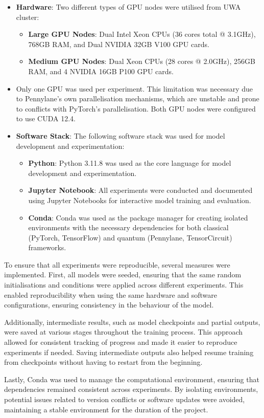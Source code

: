 \begin{itemize}
  \item \textbf{Hardware}: Two different types of GPU nodes were
        utilised from \gls{UWA} cluster:
        \begin{itemize}
          \item \textbf{Large GPU Nodes}: Dual Intel Xeon CPUs (36 cores
                total @ 3.1GHz), 768GB RAM, and Dual NVIDIA 32GB V100 GPU cards.
          \item \textbf{Medium GPU Nodes}: Dual Xeon CPUs (28 cores @
                2.0GHz), 256GB RAM, and 4 NVIDIA 16GB P100 GPU cards.
        \end{itemize}
  \item Only one GPU was used per experiment. This limitation was
        necessary due to Pennylane's own parallelisation mechanisms,
        which are unstable and prone to conflicts with PyTorch’s parallelisation.
        Both GPU nodes were configured to use CUDA 12.4.

  \item \textbf{Software Stack}: The following software stack was used
        for model development and experimentation:
        \begin{itemize}
          \item \textbf{Python}: Python 3.11.8 was used as the core
                language for model development and experimentation.
          \item \textbf{Jupyter Notebook}: All experiments were conducted
                and documented using Jupyter Notebooks for interactive model
                training and evaluation.
          \item \textbf{Conda}: Conda was used as the package manager for
                creating isolated environments with the necessary
                dependencies for both classical (PyTorch, TensorFlow) and
                quantum (Pennylane, TensorCircuit) frameworks.
        \end{itemize}
\end{itemize}

To ensure that all experiments were reproducible, several measures
were implemented. First, all models were seeded, ensuring that the
same random initialisations and conditions were applied across
different experiments. This enabled reproducibility when using the
same hardware and software configurations, ensuring consistency in
the behaviour of the model.

Additionally, intermediate results, such as model checkpoints and
partial outputs, were saved at various stages throughout the training
process. This approach allowed for consistent tracking of progress
and made it easier to reproduce experiments if needed. Saving
intermediate outputs also helped resume training from checkpoints
without having to restart from the beginning.

Lastly, Conda was used to manage the computational environment,
ensuring that dependencies remained consistent across experiments. By
isolating environments, potential issues related to version conflicts
or software updates were avoided, maintaining a stable environment
for the duration of the project.
